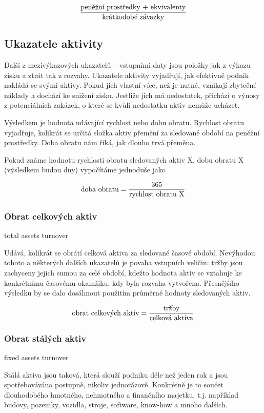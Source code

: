 $$\dfrac{\text{peněžní prostředky $+$ ekvivalenty}}{\text{krátkodobé závazky}}$$








\subsection{Ukazatele aktivity}
Další z mezivýkazových ukazatelů -- vstupními daty jsou položky jak z výkazu zisku a ztrát tak z rozvahy. Ukazatele aktivity vyjadřují, jak efektivně podnik nakládá se svými aktivy. Pokud jich vlastní více, než je nutné, vznikají zbytečné náklady a dochází ke snižení zisku. Jestliže jich má nedostatek, přichází o výnosy z potenciálních zakázek, o které se kvůli nedostatku aktiv nemůže ucházet.

Výsledkem je hodnota udávající rychlost nebo dobu obratu. Rychlost obratu vyjadřuje, kolikrát se určitá složka aktiv přemění za sledované období na peněžní prostředky. Doba obratu nám říká, jak dlouho trvá přeměna.

Pokud známe hodnotu rychlosti obratu sledovaných aktiv X, dobu obratu X (výsledkem budou dny) vypočítáme jednoduše jako 

$$\text{doba obratu} = \dfrac{\text{365}}{\text{rychlost obratu X}}$$

\subsubsection{Obrat celkových aktiv}

total assets turnover

Udává, kolikrát se obrátí celková aktiva za sledované časové období. Nevýhodou tohoto a některých dalších ukazatelů je povaha vstupních veličin: tržby jsou zachyceny jejich sumou za celé období, kdežto hodnota aktiv se vztahuje ke konkrétnímu časovému okamžiku, kdy byla rozvaha vytvořena. Přesnějšího výsledku by se dalo dosáhnout použitím průměrné hodnoty sledovaných aktiv. 

$$\text{obrat celkových aktiv} = \dfrac{\text{tržby}}{\text{celková aktiva}}$$

\subsubsection{Obrat stálých aktiv}

fixed assets turnover

Stálá aktiva jsou taková, která slouží podniku déle než jeden rok a jsou spotřebovávána postupně, nikoliv jednorázově. Konkrétně je to součet dlouhodobého hmotného, nehmotného a finančního majetku, t.j. například budovy, pozemky, vozidla, stroje, software, know-how a mnoho dalších.

